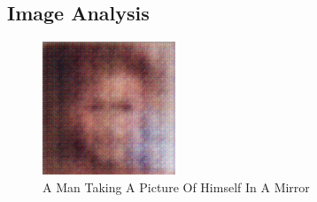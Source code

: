\documentclass{article}%
\begin{document}
%
\subsection{Image Analysis}%
\label{subsec:ImageAnalysis}%


\begin{figure}[h!]%
\centering%
\includegraphics[width=150px]{500_fake_images/samples_5_196.png}%
\caption{A Man Taking A Picture Of Himself In A Mirror}%
\end{figure}

%
\end{document}
